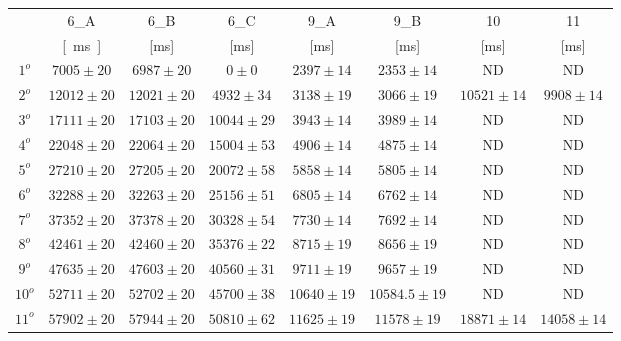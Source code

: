 \documentclass[a4paper,11pt,oneside]{article}
\begin{document}
\begin{table}[h!]
{\begin{tabular}{|c|c|c|c|c|c|c|c|}
& 6_A & 6_B & 6_C & 9_A & 9_B & 10 & 11\\
& \si{[ms]} & [ms] & [ms] & [ms] & [ms] & [ms] & [ms]\\ \hline
{\rowcolor[rgb]{0.85,0.85,0.85}}$1^o$ & $7005 \pm 20$ & $6987 \pm 20$ & $0 \pm 0$ & $2397 \pm 14$ & $2353 \pm 14$ & ND & ND \\ \hline
$2^o$ & $12012 \pm 20$ & $12021 \pm 20$ & $4932 \pm 34$ & $3138 \pm 19$ & $3066 \pm 19$ & $10521 \pm 14$ & $9908 \pm 14$ \\ \hline
{\rowcolor[rgb]{0.85,0.85,0.85}}$3^o$ & $17111 \pm 20$ & $17103 \pm 20$ & $10044 \pm 29$ & $3943 \pm 14$ & $3989 \pm 14$ & ND & ND \\ \hline
$4^o$ & $22048 \pm 20$ & $22064 \pm 20$ & $15004 \pm 53$ & $4906 \pm 14$ & $4875 \pm 14$ & ND & ND \\ \hline
{\rowcolor[rgb]{0.85,0.85,0.85}}$5^o$ & $27210 \pm 20$ & $27205 \pm 20$ & $20072 \pm 58$ & $5858 \pm 14$ & $5805 \pm 14$ & ND & ND \\ \hline
$6^o$ & $32288 \pm 20$ & $32263 \pm 20$ & $25156 \pm 51$ & $6805 \pm 14$ & $6762 \pm 14$ & ND & ND \\ \hline
{\rowcolor[rgb]{0.85,0.85,0.85}}$7^o$ & $37352 \pm 20$ & $37378 \pm 20$ & $30328 \pm 54$ & $7730 \pm 14$ & $7692 \pm 14$ & ND & ND \\ \hline
$8^o$ & $42461 \pm 20$ & $42460 \pm 20$ & $35376 \pm 22$ & $8715 \pm 19$ & $8656 \pm 19$ & ND & ND \\ \hline
{\rowcolor[rgb]{0.85,0.85,0.85}}$9^o$ & $47635 \pm 20$ & $47603 \pm 20$ & $40560 \pm 31$ & $9711 \pm 19$ & $9657 \pm 19$ & ND & ND \\ \hline
$10^o$ & $52711 \pm 20$ & $52702 \pm 20$ & $45700 \pm 38$ & $10640 \pm 19$ & $10584.5 \pm 19$ & ND & ND \\ \hline
{\rowcolor[rgb]{0.85,0.85,0.85}}$11^o$ & $57902 \pm 20$ & $57944 \pm 20$ & $50810 \pm 62$ & $11625 \pm 19$ & $11578 \pm 19$ & $18871 \pm 14$ & $14058 \pm 14$ \\ \hline
\end{tabular}}
\end{table}
\end{document}
